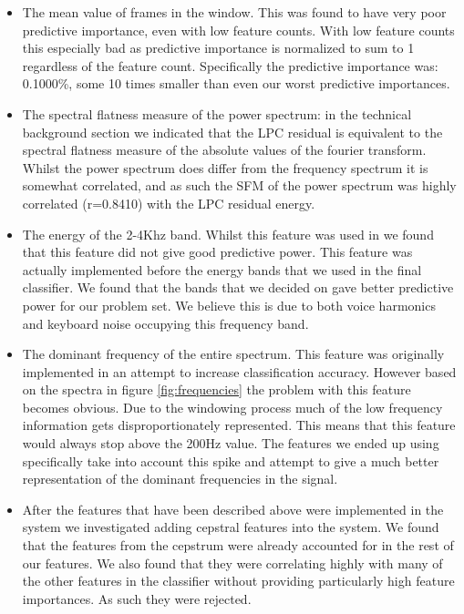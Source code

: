 \documentclass[ %
                    author={Sam Phippen},
                supervisor={Dr. Rafal Bogacz},
                     title={Real time voice activity detectors in noisy personal computing environments},
                  subtitle={},
                    degree={MEng},
                      year={2012} ]{thesis}
\begin{document}
\begin{itemize}

    \item The mean value of frames in the window. This was found to have very
        poor predictive importance, even with low feature counts. With low
        feature counts this especially bad as predictive importance is
        normalized to sum to 1 regardless of the feature count. Specifically
        the predictive importance was: 0.1000\%, some 10 times smaller than even
        our worst predictive importances.

    \item The spectral flatness measure of the power spectrum: in the technical
        background section we indicated that the LPC residual is equivalent to
        the spectral flatness measure of the absolute values of the fourier
        transform. Whilst the power spectrum does differ from the frequency
        spectrum it is somewhat correlated, and as such the SFM of the power
        spectrum was highly correlated (r=0.8410) with the LPC residual energy.

    \item The energy of the 2-4Khz band. Whilst this feature was used in
        \cite{shin} we found that this feature did not give good predictive
        power. This feature was actually implemented before the energy bands
        that we used in the final classifier. We found that the bands that we
        decided on gave better predictive power for our problem set. We believe
        this is due to both voice harmonics and keyboard noise occupying this
        frequency band.

    \item The dominant frequency of the entire spectrum. This feature was
        originally implemented in an attempt to increase classification
        accuracy. However based on the spectra in figure \ref{fig:frequencies}
        the problem with this feature becomes obvious. Due to the windowing
        process much of the low frequency information gets disproportionately
        represented. This means that this feature would always stop above the
        200Hz value. The features we ended up using specifically take into
        account this spike and attempt to give a much better representation of
        the dominant frequencies in the signal.

    \item After the features that have been described above were implemented in
        the system we investigated adding cepstral features into the system. We
        found that the features from the cepstrum were already accounted for in
        the rest of our features. We also found that they were correlating
        highly with many of the other features in the classifier without
        providing particularly high feature importances. As such they were
        rejected.

    \end{itemize}
\end{document}
